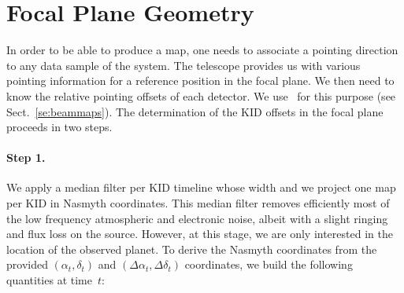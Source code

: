 %
%
%

\section{Focal Plane Geometry}%
\label{se:fov_geometry}



In order to be able to produce a map, one needs to associate a pointing
direction to any data sample of the system. The telescope provides us with
various pointing information for a reference position in the focal plane. We
then need to know the relative pointing offsets of each detector. We use
\bms\ for this purpose (see Sect.~\ref{se:beammaps}). The determination of the
KID offsets in the focal plane proceeds in two steps.

\paragraph{Step 1.} We apply a median filter per
KID timeline whose width 
and we project one map per KID in Nasmyth
coordinates. This median filter removes
efficiently most of the low frequency atmospheric and electronic
noise, albeit with a slight ringing and flux loss on the
source. However, at this stage, we are only interested in the location
of the observed planet.
To derive the Nasmyth coordinates from the
provided $(\alpha_t,\delta_t)$ and $(\Delta\alpha_t,\Delta\delta_t)$
coordinates, we build the following quantities at time~$t$:


